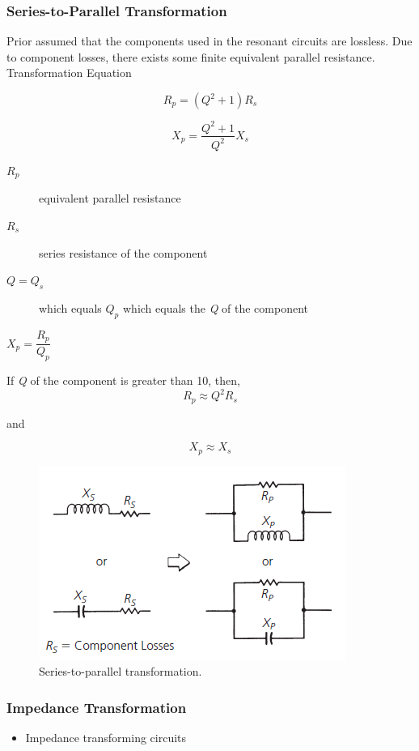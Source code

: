 \subsubsection{Series-to-Parallel Transformation}
Prior assumed that the components used in the resonant circuits are lossless. Due to component losses, there exists some finite equivalent parallel resistance.\\

\noindent Transformation Equation

\begin{equation}
R_p = (Q^2 +1)R_s
\end{equation}

\begin{equation}
X_p = \dfrac{Q^2+1}{Q^2}X_s
\end{equation}

\begin{description}
	\item[$R_p$] equivalent parallel resistance
	\item[$R_s$] series resistance of the component
	\item[$Q = Q_s$] which equals $Q_p$ which equals the \textit{Q} of the component
	\item[$X_p = \dfrac{R_p}{Q_p}$]
\end{description}

\noindent If \textit{Q} of the component is greater than 10, then,
\begin{equation}
R_p \approx Q^2 R_s
\end{equation}

\noindent and

\begin{equation}
X_p \approx X_s
\end{equation}
\begin{figure} [H]
	\centering
	\includegraphics[width=0.5\linewidth]{graphics/23.png}
	\caption{Series-to-parallel transformation.}
\end{figure}
\newpage
\subsubsection{Impedance Transformation}
\begin{itemize}
	\item Impedance transforming circuits
\end{itemize}

